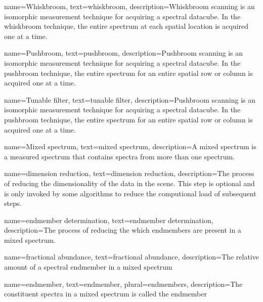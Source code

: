 {
name={Whiskbroom},
text={whiskbroom},
description={Whiskbroom scanning is an isomorphic measurement technique for acquiring a spectral datacube. In the whiskbroom technique, the entire spectrum at each spatial location is acquired one at a time.}
}

{
name={Pushbroom},
text={pushbroom},
description={Pushbroom scanning is an isomorphic measurement technique for acquiring a spectral datacube. In the pushbroom technique, the entire spectrum for an entire spatial row or column is acquired one at a time.}
}


{
name={Tunable filter},
text={tunable filter},
description={Pushbroom scanning is an isomorphic measurement technique for acquiring a spectral datacube. In the pushbroom technique, the entire spectrum for an entire spatial row or column is acquired one at a time.}
}

{
name={Mixed spectrum},
text={mixed spectrum},
description={A mixed spectrum is a measured spectrum that contains spectra from more than one spectrum.}
}

{
name={dimension reduction},
text={dimension reduction},
description={The process of reducing the dimensionality of the data in the scene. This step is optional and is only invoked by some algorithms to reduce the computional load of subsequent steps. }
}

{
name={endmember determination},
text={endmember determination},
description={The process of reducing the which endmembers are present in a mixed spectrum. }
}

{
name={fractional abundance},
text={fractional abundance},
description={The relative amount of a spectral endmember in a mixed spectrum}
}

{
name={endmember},
text={endmember},
plural={endmembers},
description={The constituent spectra in a mixed spectrum is called the endmember}
}


